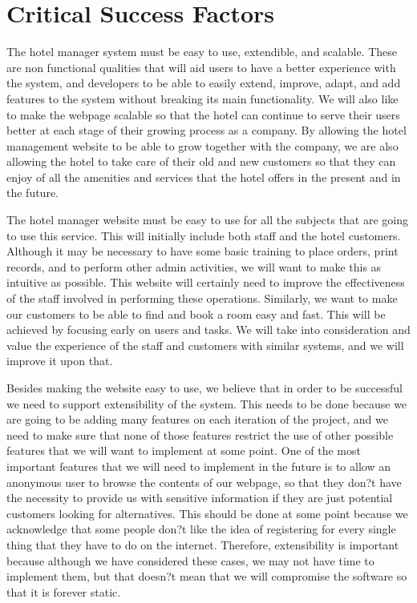 \section{Critical Success Factors}
The hotel manager system must be easy to use, extendible, and scalable. These are
non functional qualities that will aid users to have a better experience with the system, and
developers to be able to easily extend, improve, adapt, and add features to the system without
breaking its main functionality. We will also like to make the webpage scalable so that the hotel
can continue to serve their users better at each stage of their growing process as a company. By
allowing the hotel management website to be able to grow together with the company, we are
also allowing the hotel to take care of their old and new customers so that they can enjoy of all
the amenities and services that the hotel offers in the present and in the future.

The hotel manager website must be easy to use for all the subjects that are going to use
this service. This will initially include both staff and the hotel customers. Although it may be
necessary to have some basic training to place orders, print records, and to perform other admin
activities, we will want to make this as intuitive as possible. This website will certainly need
to improve the effectiveness of the staff involved in performing these operations. Similarly,
we want to make our customers to be able to find and book a room easy and fast. This will be
achieved by focusing early on users and tasks. We will take into consideration and value the
experience of the staff and customers with similar systems, and we will improve it upon that.

Besides making the website easy to use, we believe that in order to be successful we need
to support extensibility of the system. This needs to be done because we are going to be adding
many features on each iteration of the project, and we need to make sure that none of those
features restrict the use of other possible features that we will want to implement at some point.
One of the most important features that we will need to implement in the future is to allow an
anonymous user to browse the contents of our webpage, so that they don?t have the necessity to
provide us with sensitive information if they are just potential customers looking for alternatives.
This should be done at some point because we acknowledge that some people don?t like the idea
of registering for every single thing that they have to do on the internet. Therefore, extensibility
is important because although we have considered these cases, we may not have time to
implement them, but that doesn?t mean that we will compromise the software so that it is forever
static.
